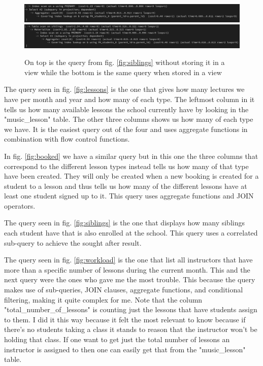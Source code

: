 \documentclass[a4paper]{scrreprt}
\begin{document}
\begin{figure}[h]
    \begin{center}
        \includegraphics[width=\textwidth]{../img/explain_no_view_siblings.png} \\
        \includegraphics[width=\textwidth]{../img/explain_sibling.png}
        \caption{On top is the query from fig. \ref{fig:siblings} without storing it in a view while the bottom is the same query when stored in a view}
        \label{fig:explainSiblings}
    \end{center}
\end{figure}

The query seen in fig. \ref{fig:lessons} is the one that gives how many lectures we have per month and year and how many of each type. The leftmost column in it tells us how many 
available lessons the school currently have by looking in the "music\_lesson" table. The other three columns shows us how many of each type we have. It is the easiest query out of 
the four and uses aggregate functions in combination with flow control functions.

In fig. \ref{fig:booked} we have a similar query but in this one the three columns that correspond to the different lesson types instead tells us how many of that type have been created. They will only 
be created when a new booking is created for a student to a lesson and thus tells us how many of the different lessons have at least one student signed up to it. This query uses aggregate functions and 
JOIN operators.


The query seen in fig. \ref{fig:siblings} is the one that displays how many siblings each student have that is also enrolled at the school. This query uses a correlated sub-query to achieve the sought after 
result.

The query seen in fig. \ref{fig:workload} is the one that list all instructors that have more than a specific number of lessons during the current month. This and the next query were the ones who gave me the most 
trouble. This because the query makes use of sub-queries, JOIN clauses, aggregate functions, and conditional filtering, making it quite complex for me. 
Note that the column "total\_number\_of\_lessons" is counting just the lessons that have students assign to them. I did it this way because it felt the most relevant to know because if there's no students 
taking a class it stands to reason that the instructor won't be holding that class. If one want to get just the total number of lessons an instructor is assigned to then one can easily get that from the 
"music\_lesson" table.
\end{document}

